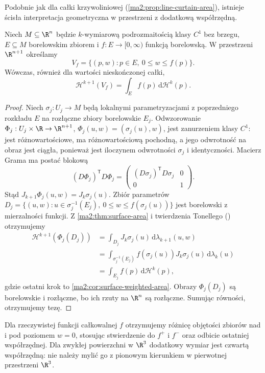 Podobnie jak dla całki krzywoliniowej
(\ref{ma2:prop:line-curtain-area}), istnieje
ścisła interpretacja geometryczna w przestrzeni
z dodatkową współrzędną.

\begin{stwierdzenie}
\label{ma2:prop:surface-subgraph-volume}
Niech $M\subseteq\R^n$ będzie $k$-wymiarową
podrozmaitością klasy $C^1$ bez brzegu,
$E\subseteq M$ borelowskim zbiorem i
$f:E\to[0,\infty)$ funkcją borelowską.
W przestrzeni $\R^{n+1}$ określamy
\[
 V_f=\{(p,w):p\in E,\ 0\le w\le f(p)\}.
\]
Wówczas, również dla wartości nieskończonej całki,
\[
 \mathcal H^{k+1}(V_f)
 =\int_E f(p)\,\mathrm d\mathcal H^k(p).
\]
\end{stwierdzenie}
\begin{proof}
Niech $\sigma_j:U_j\to M$ będą lokalnymi
parametryzacjami z poprzedniego rozkładu $E$
na rozłączne zbiory borelowskie $E_j$.
Odwzorowanie
$\Phi_j:U_j\times\R\to\R^{n+1}$,
$\Phi_j(u,w)=(\sigma_j(u),w)$,
jest zanurzeniem klasy $C^1$: jest
różnowartościowe, ma różnowartościową pochodną,
a jego odwrotność na obraz jest ciągła, ponieważ
jest iloczynem odwrotności $\sigma_j$ i identyczności.
Macierz Grama ma postać blokową
\[
 (D\Phi_j)^{\mathsf T}D\Phi_j
 =
 \begin{pmatrix}
  (D\sigma_j)^{\mathsf T}D\sigma_j & 0\\
  0 & 1
 \end{pmatrix}.
\]
Stąd $J_{k+1}\Phi_j(u,w)=J_k\sigma_j(u)$.
Zbiór parametrów
$D_j=\{(u,w):u\in\sigma_j^{-1}(E_j),\
0\le w\le f(\sigma_j(u))\}$
jest borelowski z mierzalności funkcji.
Z \ref{ma2:thm:surface-area} i twierdzenia
Tonellego
()
otrzymujemy
\[
 \begin{aligned}
 \mathcal H^{k+1}(\Phi_j(D_j))
 &=\int_{D_j}J_k\sigma_j(u)\,
                 \mathrm d\lambda_{k+1}(u,w)\\
 &=\int_{\sigma_j^{-1}(E_j)}
 f(\sigma_j(u))J_k\sigma_j(u)\,\mathrm d\lambda_k(u)\\
 &=\int_{E_j} f(p)\,\mathrm d\mathcal H^k(p),
 \end{aligned}
\]
gdzie ostatni krok to \ref{ma2:cor:surface-weighted-area}.
Obrazy $\Phi_j(D_j)$ są borelowskie i rozłączne,
bo ich rzuty na $\R^n$ są rozłączne.
Sumując równości, otrzymujemy tezę.
\end{proof}

Dla rzeczywistej funkcji całkowalnej $f$
otrzymujemy różnicę objętości zbiorów nad
i pod poziomem $w=0$, stosując stwierdzenie
do $f^+$ i $f^-$ oraz odbicie ostatniej
współrzędnej. Dla zwykłej powierzchni w $\R^3$
dodatkowy wymiar jest czwartą współrzędną:
nie należy mylić go z pionowym kierunkiem
w pierwotnej przestrzeni $\R^3$.

